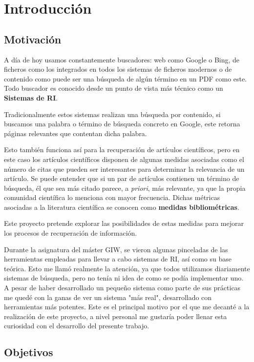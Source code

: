 \chapter{Introducción}
\section{Motivación}

A día de hoy usamos constantemente buscadores: web como Google o Bing, de ficheros como los integrados en todos los sistemas de ficheros modernos o de contenido como puede ser una búsqueda de algún término en un \acrshort{PDF} como este. Todo buscador es conocido desde un punto de vista más técnico como un \textbf{Sistemas de \acrfull{RI}}. 

Tradicionalmente estos sistemas realizan una búsqueda por contenido, si buscamos una palabra o término de búsqueda concreto en Google, este retorna páginas relevantes que contentan dicha palabra. 

Esto también funciona así para la recuperación de artículos científicos, pero en este caso los artículos científicos disponen de algunas medidas asociadas como el número de citas que pueden ser interesantes para determinar la relevancia de un artículo. Se puede entender que si un par de artículos contienen un término de búsqueda, él que sea más citado parece, a \textit{priori}, más relevante, ya que la propia comunidad científica lo menciona con mayor frecuencia. Dichas métricas asociadas a la literatura científica se conocen como \textbf{medidas bibliométricas}.

Este proyecto pretende explorar las posibilidades de estas medidas para mejorar los procesos de recuperación de información.

Durante la asignatura del máster \acrfull{GIW}, se vieron algunas pinceladas de las herramientas empleadas para llevar a cabo sistemas de \acrlong{RI}, así como su base teórica. Esto me llamó realmente la atención, ya que todos utilizamos diariamente sistemas de búsqueda, pero no tenía ni idea de como se podía implementar uno. A pesar de haber desarrollado un pequeño sistema como parte de sus prácticas me quedé con la ganas de ver un sistema "más real", desarrollado con herramientas más potentes. Este es el principal motivo por el que me decanté a la realización de este proyecto, a nivel personal me gustaría poder llenar esta curiosidad con el desarrollo del presente trabajo.

\section{Objetivos}

